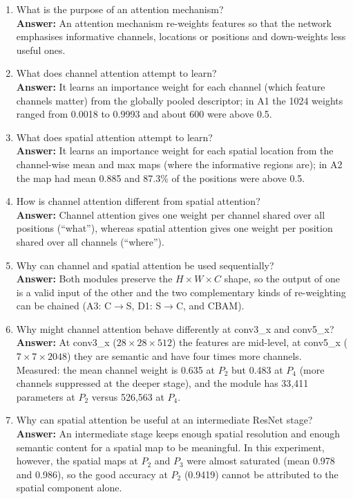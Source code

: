 \documentclass[10pt]{article}
\begin{document}
\begin{enumerate}
\item What is the purpose of an attention mechanism?\\
\textbf{Answer:} An attention mechanism re-weights features so that the network emphasises informative channels, locations or positions and down-weights less useful ones.

\item What does channel attention attempt to learn?\\
\textbf{Answer:} It learns an importance weight for each channel (which feature channels matter) from the globally pooled descriptor; in A1 the 1024 weights ranged from 0.0018 to 0.9993 and about 600 were above 0.5.

\item What does spatial attention attempt to learn?\\
\textbf{Answer:} It learns an importance weight for each spatial location from the channel-wise mean and max maps (where the informative regions are); in A2 the map had mean 0.885 and 87.3\% of the positions were above 0.5.

\item How is channel attention different from spatial attention?\\
\textbf{Answer:} Channel attention gives one weight per channel shared over all positions (``what''), whereas spatial attention gives one weight per position shared over all channels (``where'').

\item Why can channel and spatial attention be used sequentially?\\
\textbf{Answer:} Both modules preserve the $H\times W\times C$ shape, so the output of one is a valid input of the other and the two complementary kinds of re-weighting can be chained (A3: C$\rightarrow$S, D1: S$\rightarrow$C, and CBAM).

\item Why might channel attention behave differently at conv3\_x and
conv5\_x?\\
\textbf{Answer:} At conv3\_x ($28\times28\times512$) the features are mid-level, at conv5\_x ($7\times7\times2048$) they are semantic and have four times more channels. Measured: the mean channel weight is 0.635 at $P_2$ but 0.483 at $P_4$ (more channels suppressed at the deeper stage), and the module has 33{,}411 parameters at $P_2$ versus 526{,}563 at $P_4$.

\item Why can spatial attention be useful at an intermediate ResNet stage?\\
\textbf{Answer:} An intermediate stage keeps enough spatial resolution and enough semantic content for a spatial map to be meaningful. In this experiment, however, the spatial maps at $P_2$ and $P_3$ were almost saturated (mean 0.978 and 0.986), so the good accuracy at $P_2$ (0.9419) cannot be attributed to the spatial component alone.


\end{enumerate}
\end{document}
